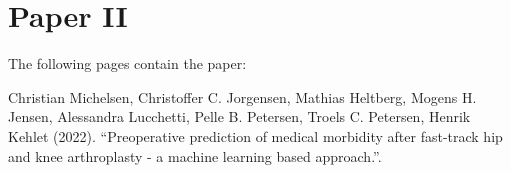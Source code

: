 \chapter{Paper II}
\label{chapter:hospital}

The following pages contain the paper:
\vspace*{1cm}


Christian Michelsen, Christoffer C. Jorgensen, Mathias Heltberg, Mogens H. Jensen, Alessandra Lucchetti, Pelle B. Petersen, Troels C. Petersen, Henrik Kehlet (2022). ``Preoperative prediction of medical morbidity after fast-track hip and knee arthroplasty - a machine learning based approach.''.


% 
